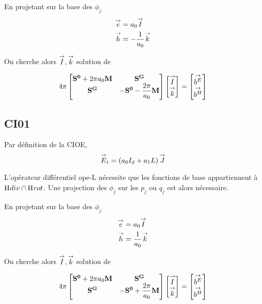       En projetant sur la base des \(\phi_j\)
      \begin{align}
        {\overset{\rightarrow}{e}} &= a_0 {\overset{\rightarrow}{I}} \\
        {\overset{\rightarrow}{h}} &= -\dfrac{1}{a_0} {\overset{\rightarrow}{k}}
      \end{align}

    On cherche alors \({\overset{\rightarrow}{I}},{\overset{\rightarrow}{k}}\) solution de 

    \begin{equation}
      4\pi
      \begin{bmatrix}
        \mathbf{S^0}+2\pi a_0 \mathbf{M} & \mathbf{S^G} \\
        \mathbf{S^G} & -\mathbf{S^0} - \dfrac{2\pi}{a_0}\mathbf{M}
      \end{bmatrix}
      \begin{bmatrix}
        {\overset{\rightarrow}{I}}\\
        {\overset{\rightarrow}{k}}
      \end{bmatrix}
      =
      \begin{bmatrix}
        {\overset{\rightarrow}{b^E}}\\
        {\overset{\rightarrow}{b^H}}
      \end{bmatrix}     
    \end{equation}

    \subsection{CI01}
      Par définition de la CIOE,
      \begin{equation}
          {\overset{\rightarrow}{E}}_t = \left(a_0I_d + a_1 L\right) {\overset{\rightarrow}{J}}
      \end{equation}

      L'opérateur différentiel \gls{ope-L} nécessite que les fonctions de base appartiennent à \(\mathrm{H}_\mathrm{{}}{div}\cap\mathrm{H}_\mathrm{{}}{rot}\). Une projection des $\phi_j$ sur les $p_j$ ou $q_j$ est alors nécessaire.

      En projetant sur la base des \(\phi_j\)
      \begin{align}
        {\overset{\rightarrow}{e}} &= a_0 {\overset{\rightarrow}{I}} \\
        {\overset{\rightarrow}{h}} &= \dfrac{1}{a_0} {\overset{\rightarrow}{k}}
      \end{align}

    On cherche alors \({\overset{\rightarrow}{I}},{\overset{\rightarrow}{k}}\) solution de 

    \begin{equation}
      4\pi
      \begin{bmatrix}
        \mathbf{S^0}+2\pi a_0 \mathbf{M} & \mathbf{S^G} \\
        \mathbf{S^G} & -\mathbf{S^0} +  \dfrac{2\pi}{a_0}\mathbf{M}
      \end{bmatrix}
      \begin{bmatrix}
        {\overset{\rightarrow}{I}}\\
        {\overset{\rightarrow}{k}}
      \end{bmatrix}
      =
      \begin{bmatrix}
        {\overset{\rightarrow}{b^E}}\\
        {\overset{\rightarrow}{b^H}}
      \end{bmatrix}     
    \end{equation}


